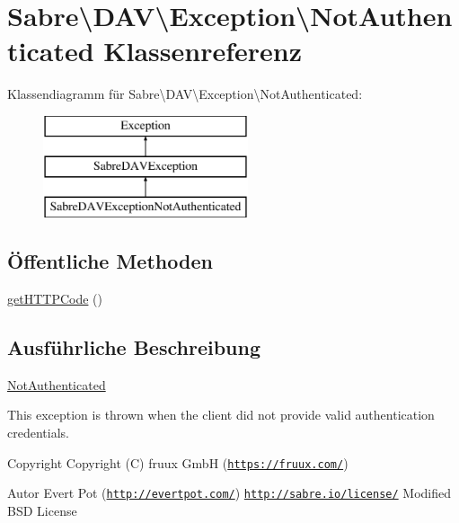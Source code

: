 \hypertarget{class_sabre_1_1_d_a_v_1_1_exception_1_1_not_authenticated}{}\section{Sabre\textbackslash{}D\+AV\textbackslash{}Exception\textbackslash{}Not\+Authenticated Klassenreferenz}
\label{class_sabre_1_1_d_a_v_1_1_exception_1_1_not_authenticated}
Klassendiagramm für Sabre\textbackslash{}D\+AV\textbackslash{}Exception\textbackslash{}Not\+Authenticated\+:\begin{figure}[H]
\begin{center}
\leavevmode
\includegraphics[height=3.000000cm]{class_sabre_1_1_d_a_v_1_1_exception_1_1_not_authenticated}
\end{center}
\end{figure}
\subsection*{Öffentliche Methoden}
\begin{DoxyCompactItemize}
\item 
\mbox{\hyperlink{class_sabre_1_1_d_a_v_1_1_exception_1_1_not_authenticated_ac9f540017c2117058dc9baaa5e611340}{get\+H\+T\+T\+P\+Code}} ()
\end{DoxyCompactItemize}


\subsection{Ausführliche Beschreibung}
\mbox{\hyperlink{class_sabre_1_1_d_a_v_1_1_exception_1_1_not_authenticated}{Not\+Authenticated}}

This exception is thrown when the client did not provide valid authentication credentials.

\begin{DoxyCopyright}{Copyright}
Copyright (C) fruux GmbH (\href{https://fruux.com/}{\tt https\+://fruux.\+com/}) 
\end{DoxyCopyright}
\begin{DoxyAuthor}{Autor}
Evert Pot (\href{http://evertpot.com/}{\tt http\+://evertpot.\+com/})  \href{http://sabre.io/license/}{\tt http\+://sabre.\+io/license/} Modified B\+SD License 
\end{DoxyAuthor}


